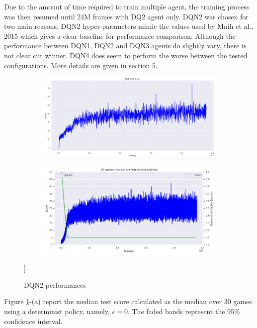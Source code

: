 \documentclass{article}
\begin{document}
Due to the amount of time required to train multiple agent, the training process was then resumed until 24M frames with DQ2 agent only. DQN2 was chosen for two main reasons. DQN2 hyper-parameters mimic the values used by Mnih et al., 2015 which gives a clear baseline for performance comparison. Although the performance between DQN1, DQN2 and DQN3 agents do slightly vary, there is not clear cut winner. DQN4 does seem to perform the worse between the tested configurations. More details are given in section 5.

\begin{figure}[H]
\centering
\begin{subfigure}{0.49\textwidth}
\centering
\includegraphics[scale=0.46]{DQNTestScore.PNG}
\end{subfigure}
\begin{subfigure}{0.49\textwidth}
\centering
\includegraphics[scale=0.46]{DQNMovAvgTraining.png}
\end{subfigure}
\caption[width=0.7\textwidth]{DQN2 performances}]
\label{fig:DQN2}
\end{figure}

Figure \ref{fig:DQN2}-(a) report the median test score calculated as the median over 30 games using a determinist policy, namely, $\epsilon = 0$. The faded bands represent the 95\% confidence interval.
\end{document}
